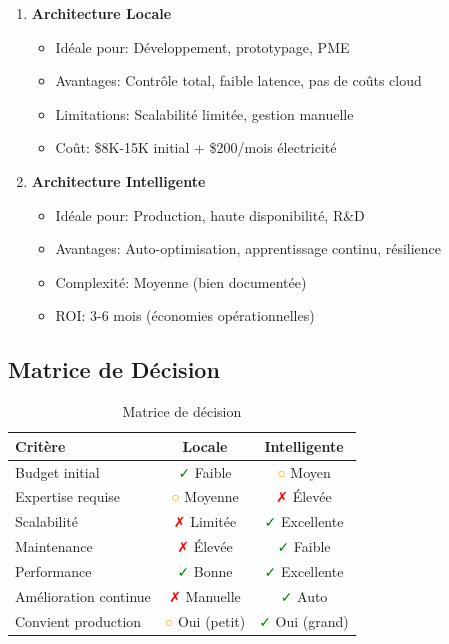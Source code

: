 \documentclass[12pt,a4paper]{article}
\begin{document}
\begin{enumerate}
    \item \textbf{Architecture Locale}
    \begin{itemize}
        \item Idéale pour: Développement, prototypage, PME
        \item Avantages: Contrôle total, faible latence, pas de coûts cloud
        \item Limitations: Scalabilité limitée, gestion manuelle
        \item Coût: \$8K-15K initial + \$200/mois électricité
    \end{itemize}
    
    \item \textbf{Architecture Intelligente}
    \begin{itemize}
        \item Idéale pour: Production, haute disponibilité, R\&D
        \item Avantages: Auto-optimisation, apprentissage continu, résilience
        \item Complexité: Moyenne (bien documentée)
        \item ROI: 3-6 mois (économies opérationnelles)
    \end{itemize}
\end{enumerate}

\subsection{Matrice de Décision}

\begin{table}[H]
\centering
\small
\begin{tabular}{|l|c|c|}
\hline
\textbf{Critère} & \textbf{Locale} & \textbf{Intelligente} \\
\hline
Budget initial & \textcolor{green}{✓} Faible & \textcolor{orange}{○} Moyen \\
\hline
Expertise requise & \textcolor{orange}{○} Moyenne & \textcolor{red}{✗} Élevée \\
\hline
Scalabilité & \textcolor{red}{✗} Limitée & \textcolor{green}{✓} Excellente \\
\hline
Maintenance & \textcolor{red}{✗} Élevée & \textcolor{green}{✓} Faible \\
\hline
Performance & \textcolor{green}{✓} Bonne & \textcolor{green}{✓} Excellente \\
\hline
Amélioration continue & \textcolor{red}{✗} Manuelle & \textcolor{green}{✓} Auto \\
\hline
Convient production & \textcolor{orange}{○} Oui (petit) & \textcolor{green}{✓} Oui (grand) \\
\hline
\end{tabular}
\caption{Matrice de décision}
\end{table}
\end{document}
